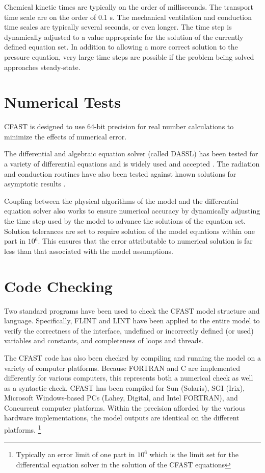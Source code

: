 Chemical kinetic times are typically on the order of milliseconds. The transport time scale are
on the order of 0.1 s. The mechanical ventilation and conduction time scales are typically
several seconds, or even longer. The time step is dynamically adjusted to a value appropriate for
the solution of the currently defined equation set. In addition to allowing a more correct solution
to the pressure equation, very large time steps are possible if the problem being solved
approaches steady-state.

\section{Numerical Tests}

CFAST is designed to use 64-bit precision for real number calculations to minimize the effects of numerical error.

The differential and algebraic equation solver (called DASSL) has been tested for a variety of differential equations and is widely used and accepted \cite{DASSL}.  The radiation and conduction routines have also been tested against known solutions for asymptotic results \cite{Forney_radiation}.

Coupling between the physical algorithms of the model and the differential equation solver also works to ensure numerical accuracy by dynamically adjusting the time step used by the model to advance the solutions of the equation set. Solution tolerances are set to require solution of the model equations within one part in $10{^6}$. This ensures that the error attributable to numerical solution is far less than that associated with the model assumptions.

\section{Code Checking}
Two standard programs have been used to check the CFAST model structure and language.  Specifically, FLINT and LINT have been applied to the entire model to verify the correctness of the interface, undefined or incorrectly defined (or used) variables and constants, and completeness of loops and threads.

The CFAST code has also been checked by compiling and running the model on a variety of computer platforms.  Because FORTRAN and C are implemented differently for various computers, this represents both a numerical check as well as a syntactic check.  CFAST has been compiled for Sun (Solaris), SGI (Irix), Microsoft Windows-based PCs (Lahey, Digital, and Intel FORTRAN), and Concurrent computer platforms.  Within the precision afforded by the various hardware implementations, the model outputs are identical on the different platforms. \footnote{Typically an error limit of one part in $10^6$ which is the limit set for the differential equation solver in the solution of the CFAST equations}

